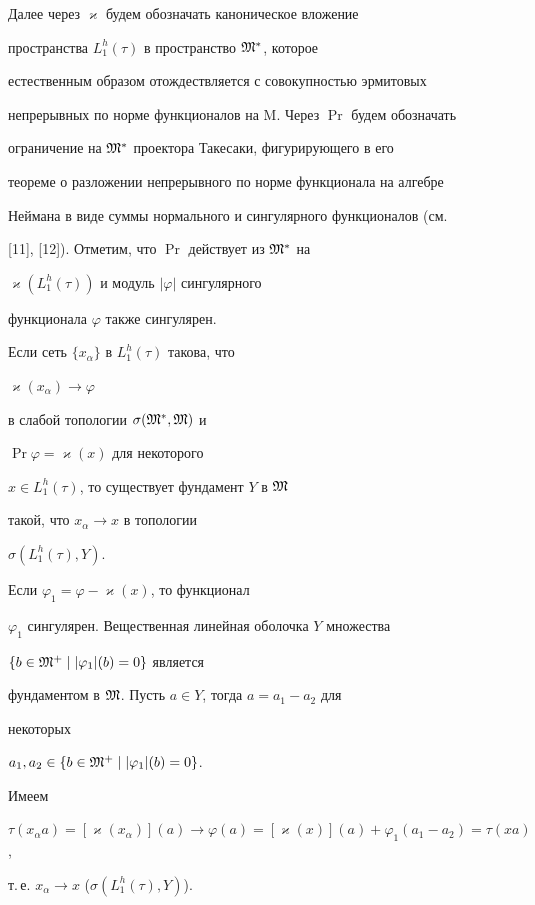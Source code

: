Далее через $\varkappa $ будем обозначать каноническое вложение 


пространства $L_1^h (\tau)$ в пространство ${\frak M}^*$, которое 


естественным образом отождествляется с совокупностью эрмитовых 


непрерывных по норме функционалов на M. Через $\Pr$ будем обозначать 


ограничение на ${\frak M}^*$ проектора Такесаки, фигурирующего в его 


теореме о разложении непрерывного по норме функционала на алгебре 


Неймана в виде суммы нормального и сингулярного функционалов (см. 


[11], [12]). Отметим, что $\Pr$ действует из ${\frak M}^*$ на 


$\varkappa (L_1^h (\tau))$ и модуль $| \varphi |$ сингулярного 


функционала $ \varphi $ также сингулярен.





\begin{lem}


Если сеть $\{x_{\alpha}\}$ в $L_1^h (\tau)$ такова, что 


$\varkappa (x_{\alpha}) \to \varphi$ 


в слабой топологии $\sigma ({\frak M}^*, {\frak M})$ и 


$\Pr \varphi=\varkappa (x)$ для некоторого 


$x \in L_1^h (\tau)$, то существует фундамент $Y$ в $\frak M$


такой, что $x_{\alpha} \to x$ в топологии 


$\sigma (L_1^h (\tau), Y)$.


\end{lem}





\begin{pf}


Если $\varphi_1=\varphi - \varkappa (x)$, то функционал 


$\varphi_1$ сингулярен. Вещественная линейная оболочка $Y$ множества 


$\{b \in {\frak M}^+ \mid | \varphi_1 | (b)=0\}$ является 


фундаментом в $\frak M$. Пусть $a \in Y$, тогда $a=a_1 - a_2$ для 


некоторых 


$a_1, a_2 \in \{b \in {\frak M}^+ \mid | \varphi_1 | (b)=0\}$.


Имеем 


$\tau (x_{\alpha} a)=[ \varkappa (x_{\alpha}) ] (a) \to 


\varphi (a)=[\varkappa (x)](a) + \varphi_1 (a_1 - a_2)=\tau (xa)$,


т.\,е. $x_{\alpha} \to x$ ($\sigma (L_1^h (\tau), Y)$).


\end{pf}





